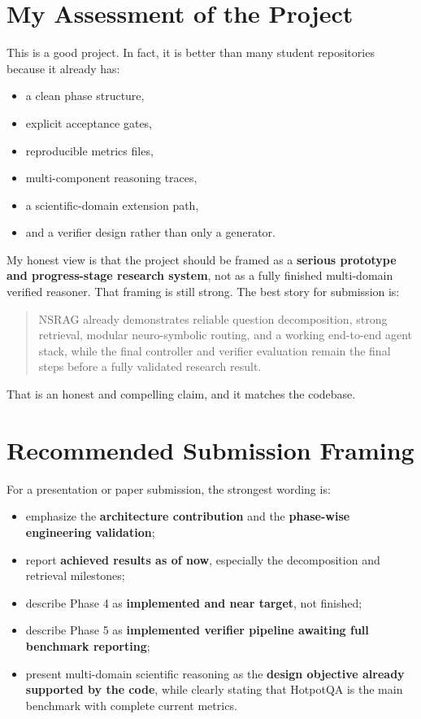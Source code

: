 \documentclass[11pt]{article}
\begin{document}
\section{My Assessment of the Project}
This is a good project. In fact, it is better than many student repositories because it already has:

\begin{itemize}[leftmargin=1.2em]
\item a clean phase structure,
\item explicit acceptance gates,
\item reproducible metrics files,
\item multi-component reasoning traces,
\item a scientific-domain extension path,
\item and a verifier design rather than only a generator.
\end{itemize}

My honest view is that the project should be framed as a \textbf{serious prototype and progress-stage research system}, not as a fully finished multi-domain verified reasoner. That framing is still strong. The best story for submission is:

\begin{quote}
NSRAG already demonstrates reliable question decomposition, strong retrieval, modular neuro-symbolic routing, and a working end-to-end agent stack, while the final controller and verifier evaluation remain the final steps before a fully validated research result.
\end{quote}

That is an honest and compelling claim, and it matches the codebase.

\section{Recommended Submission Framing}
For a presentation or paper submission, the strongest wording is:

\begin{itemize}[leftmargin=1.2em]
\item emphasize the \textbf{architecture contribution} and the \textbf{phase-wise engineering validation};
\item report \textbf{achieved results as of now}, especially the decomposition and retrieval milestones;
\item describe Phase 4 as \textbf{implemented and near target}, not finished;
\item describe Phase 5 as \textbf{implemented verifier pipeline awaiting full benchmark reporting};
\item present multi-domain scientific reasoning as the \textbf{design objective already supported by the code}, while clearly stating that HotpotQA is the main benchmark with complete current metrics.
\end{itemize}
\end{document}
